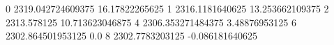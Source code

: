 0 2319.042724609375 16.17822265625
1 2316.1181640625 13.253662109375
2 2313.578125 10.713623046875
4 2306.353271484375 3.48876953125
6 2302.864501953125 0.0
8 2302.7783203125 -0.086181640625
